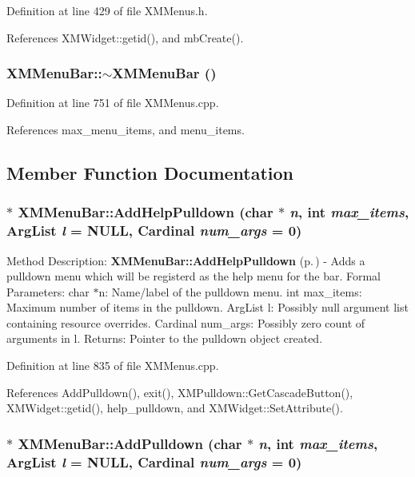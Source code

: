 Definition at line 429 of file XMMenus.h.

References XMWidget::getid(), and mb\-Create().
\subsubsection{\setlength{\rightskip}{0pt plus 5cm}XMMenu\-Bar::$\sim$XMMenu\-Bar ()}\label{classXMMenuBar_a2}




Definition at line 751 of file XMMenus.cpp.

References max\_\-menu\_\-items, and menu\_\-items.

\subsection{Member Function Documentation}
\subsubsection{ $\ast$ XMMenu\-Bar::Add\-Help\-Pulldown (char $\ast$ {\em n}, int {\em max\_\-items}, Arg\-List {\em l} = NULL, Cardinal {\em num\_\-args} = 0)}\label{classXMMenuBar_a4}


Method Description: {\bf XMMenu\-Bar::Add\-Help\-Pulldown} {\rm (p.\,\pageref{classXMMenuBar_a4})} - Adds a pulldown menu which will be registerd as the help menu for the bar. Formal Parameters: char $\ast$n: Name/label of the pulldown menu. int max\_\-items: Maximum number of items in the pulldown. Arg\-List l: Possibly null argument list containing resource overrides. Cardinal num\_\-args: Possibly zero count of arguments in l. Returns: Pointer to the pulldown object created. 

Definition at line 835 of file XMMenus.cpp.

References Add\-Pulldown(), exit(), XMPulldown::Get\-Cascade\-Button(), XMWidget::getid(), help\_\-pulldown, and XMWidget::Set\-Attribute().
\subsubsection{ $\ast$ XMMenu\-Bar::Add\-Pulldown (char $\ast$ {\em n}, int {\em max\_\-items}, Arg\-List {\em l} = NULL, Cardinal {\em num\_\-args} = 0)}\label{classXMMenuBar_a3}




